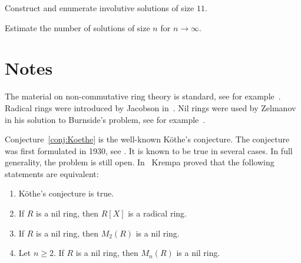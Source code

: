 



\begin{problem}
Construct and enumerate involutive solutions of size $11$. 
\end{problem}

\begin{problem}
Estimate the number of solutions of size $n$ for $n\to\infty$. 
\end{problem}

\section*{Notes}

The material on non-commutative ring theory is standard, see for example~\cite{MR3308118}.
Radical rings were introduced by Jacobson in~\cite{MR12271}. Nil rings were
used by Zelmanov in his solution to Burnside's problem, see for example~\cite{MR1199575}. 


Conjecture~\ref{conj:Koethe} is the well-known K\"othe's conjecture. 
The conjecture was first formulated in 1930, see \cite{MR1545158}. It is known to be true
in several cases. In full generality, the problem is still open. In~\cite{MR306251} 
Krempa proved that
the following statements are equivalent:
\begin{enumerate}
    \item K\"othe's conjecture is true.  
    \item If $R$ is a nil ring, then $R[X]$ is a radical ring. 
    \item If $R$ is a nil ring, then $M_2(R)$ is a nil ring. 
    \item Let $n\geq2$. If $R$ is a nil ring, then $M_n(R)$ is a nil ring. 
\end{enumerate}

